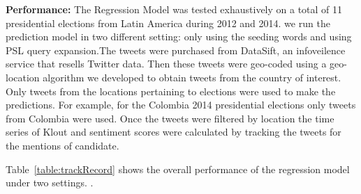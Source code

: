 \noindent
{\bf Performance:}
The Regression Model was tested exhaustively on a total of 11 presidential elections from Latin America during 2012 and 2014. we run the prediction model in two different setting: only using the seeding words and using PSL query expansion.The tweets were purchased from DataSift, an infoveilence service that resells Twitter data. Then these tweets were geo-coded using a geo-location algorithm we developed to obtain tweets from the country of interest.
Only tweets from the locations pertaining to elections were used to make the predictions.
For example, for the Colombia 2014 presidential elections only tweets from Colombia were used.
Once the tweets were filtered by location the time series of Klout and sentiment scores were calculated by tracking the tweets for the mentions of candidate.

Table~\ref{table:trackRecord} shows the overall performance of the regression model under two settings. 
.
